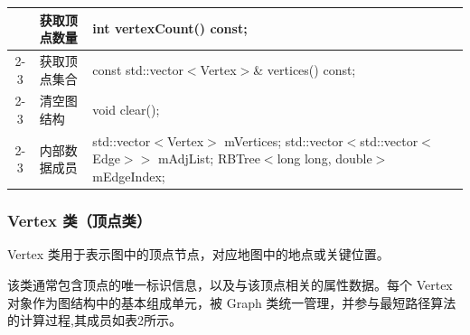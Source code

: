 \documentclass[UTF8,12pt,a4paper]{ctexart}
\begin{document}
\begin{table}[H]
\begin{tabular}{|
c|
>{\centering\arraybackslash}m{4cm}|
>{\centering\arraybackslash}m{9cm}|}
& 获取顶点数量
& int vertexCount() const; \\
\cline{2-3}

& 获取顶点集合
& const std::vector$<$Vertex$>$\& vertices() const; \\
\cline{2-3}

& 清空图结构
& void clear(); \\
\cline{2-3}

& 内部数据成员
& std::vector$<$Vertex$>$ mVertices; \newline
  std::vector$<$std::vector$<$Edge$>>$ mAdjList; \newline
  RBTree$<$long long, double$>$ mEdgeIndex; \\
\hline
\end{tabular}
\end{table}


\subsubsection{Vertex 类（顶点类）}

Vertex 类用于表示图中的顶点节点，对应地图中的地点或关键位置。

该类通常包含顶点的唯一标识信息，以及与该顶点相关的属性数据。每个 Vertex 对象作为图结构中的基本组成单元，被 Graph 类统一管理，并参与最短路径算法的计算过程,其成员如表2所示。
\end{document}
